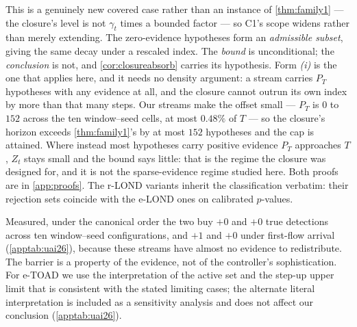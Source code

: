 \documentclass[conference]{IEEEtran}
\begin{document}
This is a genuinely new covered case rather than an instance of \cref{thm:family1} --- the closure's
level is not $\gamma_t$ times a bounded factor --- so C1's scope widens rather than merely extending.
The zero-evidence hypotheses form an \emph{admissible subset}, giving the same decay under a rescaled
index. The \emph{bound} is unconditional; the \emph{conclusion} is not, and \cref{cor:closureabsorb}
carries its hypothesis. Form \emph{(i)} is the one that applies here, and it needs no density
argument: a stream carries $P_T$ hypotheses with any evidence at all, and the closure cannot outrun
its own index by more than that many steps. Our streams make the offset small --- $P_T$ is $0$ to
$152$ across the ten window--seed cells, at most $0.48\%$ of $T$ --- so the closure's horizon exceeds
\cref{thm:family1}'s by at most $152$ hypotheses and the cap is attained. Where instead most
hypotheses carry positive evidence $P_T$ approaches $T$, $Z_t$ stays small and the bound says little:
that is the regime the closure was designed for, and it is not the sparse-evidence regime studied
here. Both proofs are in \cref{app:proofs}. The r-LOND variants inherit the classification
verbatim: their rejection sets coincide with the e-LOND ones on calibrated $p$-values.

Measured, under the canonical order the two buy $+0$ and $+0$ true detections across ten
window--seed configurations, and $+1$ and $+0$ under first-flow arrival (\cref{apptab:uai26}),
because these streams have almost no evidence to redistribute. The barrier
is a property of the evidence, not of the controller's sophistication. For e-TOAD we use the
interpretation of the active set and the step-up upper limit that is consistent with the stated limiting
cases; the alternate literal interpretation is included as a sensitivity analysis and does not affect our
conclusion (\cref{apptab:uai26}).
\end{document}
